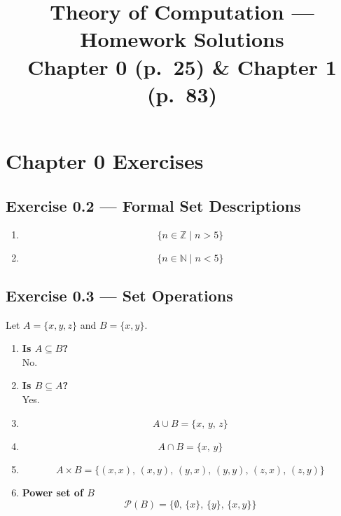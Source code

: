 \documentclass[12pt]{article}
\title{\textbf{Theory of Computation --- Homework Solutions}\\
\large Chapter 0 (p.\ 25) \& Chapter 1 (p.\ 83)}
\author{}
\date{}
\begin{document}
\maketitle

\section*{Chapter 0 Exercises}

\subsection*{Exercise 0.2 --- Formal Set Descriptions}

\begin{enumerate}[label=(\alph*), start=2]

\item
\[
  \{ n \in \mathbb{Z} \mid n > 5 \}
\]

\item
\[
  \{ n \in \mathbb{N} \mid n < 5 \}
\]

\end{enumerate}

\subsection*{Exercise 0.3 --- Set Operations}

Let $A = \{x, y, z\}$ and $B = \{x, y\}$.

\begin{enumerate}[label=(\alph*)]

\item \textbf{Is $A \subseteq B$?}\\
No. 
\item \textbf{Is $B \subseteq A$?}\\
Yes. 
\item \[
  A \cup B = \{x,\, y,\, z\}
\]

\item \[
  A \cap B = \{x,\, y\}
\]

\item \[
  A \times B = \{(x,x),\,(x,y),\,(y,x),\,(y,y),\,(z,x),\,(z,y)\}
\]

\item \textbf{Power set of $B$}\\
\[
  \mathcal{P}(B) = \bigl\{\emptyset,\,\{x\},\,\{y\},\,\{x,y\}\bigr\}
\]

\end{enumerate}
\end{document}
